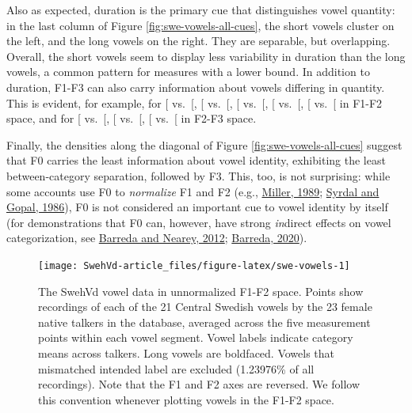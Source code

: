 \documentclass[utf8]{frontiersSCNS}
\begin{document}
Also as expected, duration is the primary cue that distinguishes vowel quantity: in the last column of Figure \ref{fig:swe-vowels-all-cues}, the short vowels cluster on the left, and the long vowels on the right. They are separable, but overlapping. Overall, the short vowels seem to display less variability in duration than the long vowels, a common pattern for measures with a lower bound. In addition to duration, F1-F3 can also carry information about vowels differing in quantity. This is evident, for example, for {[}\ipatext{iː}{]} vs.~{[}\ipatext{ɪ}{]}, {[}\ipatext{yː}{]} vs.~{[}\ipatext{ʏ}{]}, {[}\ipatext{ʉː}{]} vs.~{[}\ipatext{ɵ}{]}, {[}\ipatext{ɑː}{]} vs.~{[}\ipatext{a}{]}, {[}\ipatext{ɛː}{]} vs.~{[}\ipatext{ɛ}{]} in F1-F2 space, and for {[}\ipatext{iː}{]} vs.~{[}\ipatext{ɪ}{]}, {[}\ipatext{yː}{]} vs.~{[}\ipatext{ʏ}{]}, {[}\ipatext{ʉː}{]} vs.~{[}\ipatext{ɵ}{]} in F2-F3 space.

Finally, the densities along the diagonal of Figure \ref{fig:swe-vowels-all-cues} suggest that F0 carries the least information about vowel identity, exhibiting the least between-category separation, followed by F3. This, too, is not surprising: while some accounts use F0 to \emph{normalize} F1 and F2 (e.g., \protect\hyperlink{ref-miller1989c}{Miller, 1989}; \protect\hyperlink{ref-Syrdal1986}{Syrdal and Gopal, 1986}), F0 is not considered an important cue to vowel identity by itself (for demonstrations that F0 can, however, have strong \emph{in}direct effects on vowel categorization, see \protect\hyperlink{ref-barreda2012a}{Barreda and Nearey, 2012}; \protect\hyperlink{ref-barreda2020a}{Barreda, 2020}).





\begin{figure}

{\centering \texttt{[image: SwehVd-article\_files/figure-latex/swe-vowels-1]} 

}

\caption{The SwehVd vowel data in unnormalized F1-F2 space. Points show recordings of each of the 21 Central Swedish vowels by the 23 female native talkers in the database, averaged across the five measurement points within each vowel segment. Vowel labels indicate category means across talkers. Long vowels are boldfaced. Vowels that mismatched intended label are excluded (1.23976\% of all recordings). Note that the F1 and F2 axes are reversed. We follow this convention whenever plotting vowels in the F1-F2 space.}\label{fig:swe-vowels}
\end{figure}
\end{document}
